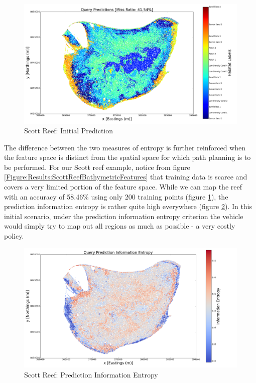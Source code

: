 \documentclass{article}
\begin{document}
		\begin{figure}[!htbp]
		\centering
			\includegraphics[width = \linewidth]{Figures/scott_reef_modeling/Figure8.png}
		\caption{Scott Reef: Initial Prediction}
		\label{Figure:Results:ScottReefInitialPredictions}
		\end{figure}
		
		The difference between the two measures of entropy is further reinforced when the feature space is distinct from the spatial space for which path planning is to be performed. For our Scott reef example, notice from figure \ref{Figure:Results:ScottReefBathymetricFeatures} that training data is scarce and covers a very limited portion of the feature space. While we can map the reef with an accuracy of 58.46\% using only 200 training points (figure \ref{Figure:Results:ScottReefInitialPredictions}), the prediction information entropy is rather quite high everywhere (figure \ref{Figure:Results:ScottReefPredictionInformationEntropy}). In this initial scenario, under the prediction information entropy criterion the vehicle would simply try to map out all regions as much as possible - a very costly policy.
		
		\begin{figure}[!htbp]
		\centering
			\includegraphics[width = \linewidth]{Figures/scott_reef_modeling/Figure9.png}
		\caption{Scott Reef: Prediction Information Entropy}
		\label{Figure:Results:ScottReefPredictionInformationEntropy}
		\end{figure}
					
\end{document}
